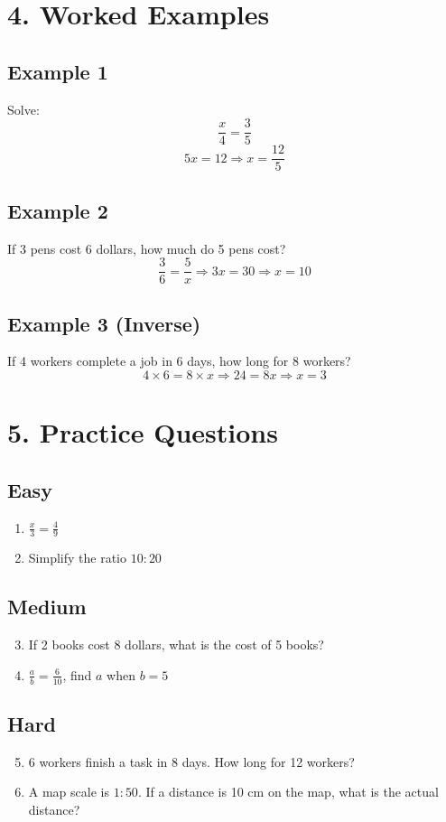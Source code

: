 \section*{4. Worked Examples}

\subsection*{Example 1}
Solve:
\[
\frac{x}{4} = \frac{3}{5}
\]
\[
5x = 12 \Rightarrow x = \frac{12}{5}
\]

\subsection*{Example 2}
If 3 pens cost 6 dollars, how much do 5 pens cost?
\[
\frac{3}{6} = \frac{5}{x} \Rightarrow 3x = 30 \Rightarrow x = 10
\]

\subsection*{Example 3 (Inverse)}
If 4 workers complete a job in 6 days, how long for 8 workers?
\[
4 \times 6 = 8 \times x \Rightarrow 24 = 8x \Rightarrow x = 3
\]

\section*{5. Practice Questions}

\subsection*{Easy}
\begin{enumerate}
    \item $\frac{x}{3} = \frac{4}{9}$
    \item Simplify the ratio $10:20$
\end{enumerate}

\subsection*{Medium}
\begin{enumerate}
    \setcounter{enumi}{2}
    \item If 2 books cost 8 dollars, what is the cost of 5 books?
    \item $\frac{a}{b} = \frac{6}{10}$, find $a$ when $b = 5$
\end{enumerate}

\subsection*{Hard}
\begin{enumerate}
    \setcounter{enumi}{4}
    \item 6 workers finish a task in 8 days. How long for 12 workers?
    \item A map scale is $1:50$. If a distance is 10 cm on the map, what is the actual distance?
\end{enumerate}

